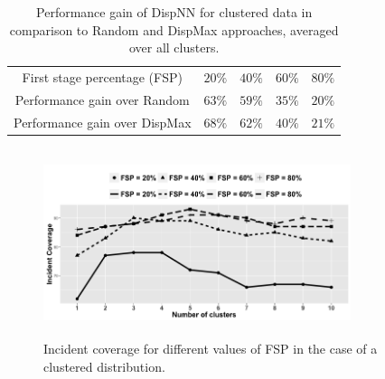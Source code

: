 \documentclass{acm_proc_article-sp}
\begin{document}
\begin{table}[!thb]
\centering
\begin{tabulary}{0.5\textwidth}{|C|C|C|C|C|}
\hline
First stage percentage (FSP) & $20\%$ & $40\%$  & $60\%$  & $80\%$  \\ \Xhline{3\arrayrulewidth}
Performance gain over Random   & $63\%$ & $59\%$  & $35\%$  & $20\%$  \\ \hline
Performance gain over DispMax   & $68\%$ & $62\%$  & $40\%$  & $21\%$ \\ \hline
\end{tabulary}
\caption{Performance gain of DispNN for clustered data in comparison to Random and DispMax approaches, averaged over all clusters.}
\label{table:clusteredSurge}
\end{table}


\begin{figure}[!htb]
\centering
\includegraphics[width=9cm ,height=5.5cm]{figuresPng/Coverage_Result.png}
\caption{Incident coverage for different values of FSP in the case of a clustered distribution. }
\label{fig: clustCoverage}
\end{figure}
\end{document}
